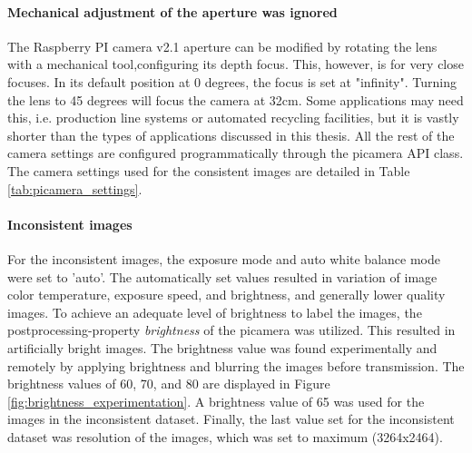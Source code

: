\paragraph{Mechanical adjustment of the aperture was ignored}
The Raspberry PI camera v2.1 aperture can be modified by rotating the lens with a mechanical tool,configuring its depth focus. This, however, is for very close focuses. In its default position at 0 degrees, the focus is set at "infinity". Turning the lens to 45 degrees will focus the camera at 32cm. Some applications may need this, i.e. production line systems or automated recycling facilities, but it is vastly shorter than the types of applications discussed in this thesis. All the rest of the camera settings are configured programmatically through the picamera API class. The camera settings used for the consistent images are detailed in Table \ref{tab:picamera_settings}.

\paragraph{Inconsistent images}
For the inconsistent images, the exposure mode and auto white balance mode were set to 'auto'. The automatically set values resulted in variation of image color temperature, exposure speed, and brightness, and generally lower quality images. To achieve an adequate level of brightness to label the images, the postprocessing-property \textit{brightness} of the picamera was utilized. This resulted in artificially bright images. The brightness value was found experimentally and remotely by applying brightness and blurring the images before transmission. The brightness values of 60, 70, and 80 are displayed in Figure \ref{fig:brightness_experimentation}. A brightness value of 65 was used for the images in the inconsistent dataset. Finally, the last value set for the inconsistent dataset was resolution of the images, which was set to maximum (3264x2464).

